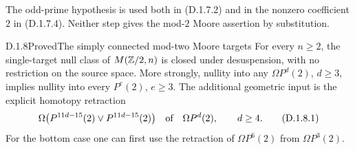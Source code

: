 The odd-prime hypothesis is used both in (D.1.7.2) and in the
nonzero coefficient $2$ in (D.1.7.4). Neither step gives the
mod-$2$ Moore assertion by substitution.

\begin{claim}{D.1.8}{Proved}{The simply connected mod-two Moore targets}
For every $n\geq2$, the single-target null class of
$M(\mathbb Z/2,n)$ is closed under desuspension, with no restriction on
the source space. More strongly, nullity into any
$\Omega P^d(2)$, $d\geq3$, implies nullity into every
$P^e(2)$, $e\geq3$. The additional geometric input is the explicit
homotopy retraction
\[
 \Omega\bigl(P^{11d-15}(2)\vee P^{11d-15}(2)\bigr)
       \quad\hbox{of}\quad \Omega P^d(2),\qquad d\geq4.
 \tag{D.1.8.1}
\]
For the bottom case one can first use the retraction of
$\Omega P^6(2)$ from $\Omega P^3(2)$.
\end{claim}
